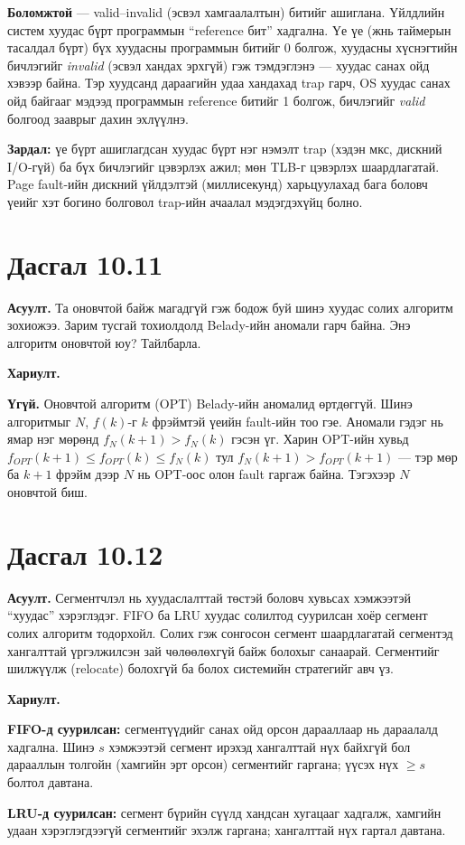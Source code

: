 \documentclass[12pt,a4paper]{article}
\newcommand{\question}[2]{\section{Дасгал #1}\textbf{Асуулт.} #2\par\medskip\textbf{Хариулт.}\par}
\begin{document}
\textbf{Боломжтой} — valid–invalid (эсвэл хамгаалалтын) битийг ашиглана. Үйлдлийн систем хуудас бүрт программын “reference бит” хадгална. Үе үе (жнь таймерын тасалдал бүрт) бүх хуудасны программын битийг 0 болгож, хуудасны хүснэгтийн бичлэгийг \emph{invalid} (эсвэл хандах эрхгүй) гэж тэмдэглэнэ — хуудас санах ойд хэвээр байна. Тэр хуудсанд дараагийн удаа хандахад trap гарч, OS хуудас санах ойд байгааг мэдээд программын reference битийг 1 болгож, бичлэгийг \emph{valid} болгоод зааврыг дахин эхлүүлнэ.

\textbf{Зардал:} үе бүрт ашиглагдсан хуудас бүрт нэг нэмэлт trap (хэдэн мкс, дискний I/O-гүй) ба бүх бичлэгийг цэвэрлэх ажил; мөн TLB-г цэвэрлэх шаардлагатай. Page fault-ийн дискний үйлдэлтэй (миллисекунд) харьцуулахад бага боловч үеийг хэт богино болговол trap-ийн ачаалал мэдэгдэхүйц болно.

\question{10.11}{Та оновчтой байж магадгүй гэж бодож буй шинэ хуудас солих алгоритм зохиожээ. Зарим тусгай тохиолдолд Belady-ийн аномали гарч байна. Энэ алгоритм оновчтой юу? Тайлбарла.}

\textbf{Үгүй.} Оновчтой алгоритм (OPT) Belady-ийн аномалид өртдөггүй. Шинэ алгоритмыг $N$, $f(k)$-г $k$ фрэймтэй үеийн fault-ийн тоо гэе. Аномали гэдэг нь ямар нэг мөрөнд $f_N(k+1) > f_N(k)$ гэсэн үг. Харин OPT-ийн хувьд $f_{OPT}(k+1) \le f_{OPT}(k) \le f_N(k)$ тул $f_N(k+1) > f_{OPT}(k+1)$ — тэр мөр ба $k+1$ фрэйм дээр $N$ нь OPT-оос олон fault гаргаж байна. Тэгэхээр $N$ оновчтой биш.

\question{10.12}{Сегментчлэл нь хуудаслалттай төстэй боловч хувьсах хэмжээтэй “хуудас” хэрэглэдэг. FIFO ба LRU хуудас солилтод суурилсан хоёр сегмент солих алгоритм тодорхойл. Солих гэж сонгосон сегмент шаардлагатай сегментэд хангалттай үргэлжилсэн зай чөлөөлөхгүй байж болохыг санаарай. Сегментийг шилжүүлж (relocate) болохгүй ба болох системийн стратегийг авч үз.}

\textbf{FIFO-д суурилсан:} сегментүүдийг санах ойд орсон дарааллаар нь дараалалд хадгална. Шинэ $s$ хэмжээтэй сегмент ирэхэд хангалттай нүх байхгүй бол дарааллын толгойн (хамгийн эрт орсон) сегментийг гаргана; үүсэх нүх $\ge s$ болтол давтана.

\textbf{LRU-д суурилсан:} сегмент бүрийн сүүлд хандсан хугацааг хадгалж, хамгийн удаан хэрэглэгдээгүй сегментийг эхэлж гаргана; хангалттай нүх гартал давтана.
\end{document}
